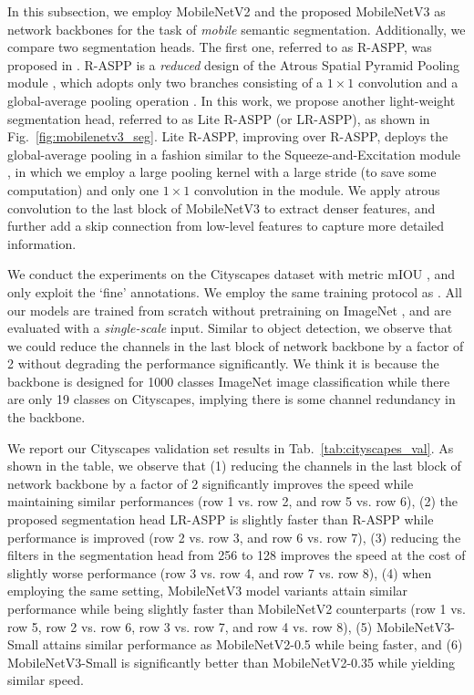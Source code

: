 \documentclass[10pt,twocolumn,letterpaper]{article}
\begin{document}
In this subsection, we employ MobileNetV2 \cite{mobilenetv2} and the proposed MobileNetV3 as network backbones for the task of {\it mobile} semantic segmentation. Additionally, we compare two segmentation heads. The first one, referred to as R-ASPP, was proposed in \cite{mobilenetv2}. R-ASPP is a {\it reduced} design of the Atrous Spatial Pyramid Pooling module \cite{DeepLabV2, DeepLabV3,DeepLabV3Plus}, which adopts only two branches consisting of a $1 \times 1$ convolution and a global-average pooling operation \cite{ParseNet,zhao2017pyramid}. In this work, we propose another light-weight segmentation head, referred to as Lite R-ASPP (or LR-ASPP), as shown in Fig.~\ref{fig:mobilenetv3_seg}. Lite R-ASPP, improving over R-ASPP, deploys the global-average pooling in a fashion similar to the Squeeze-and-Excitation module \cite{squeezeandexcite}, in which we employ a large pooling kernel with a large stride (to save some computation) and only one $1\times1$ convolution in the module. We apply atrous convolution \cite{Holschneider1989real,Sermanet2013Overfeat,Papandreou2014untangling,DeepLabV1} to the last block of MobileNetV3 to extract denser features, and further add a skip connection \cite{long2014fully} from low-level features to capture more detailed information.

We conduct the experiments on the Cityscapes dataset \cite{Cordts2016Cityscapes} with metric mIOU \cite{PASCAL}, and only exploit the `fine' annotations. We employ the same training protocol as \cite{DeepLabV3, mobilenetv2}. All our models are trained from scratch without pretraining on ImageNet \cite{russakovsky:2015:ILS:2846547.2846559}, and are evaluated with a {\it single-scale} input. Similar to object detection, we observe that we could reduce the channels in the last block of network backbone by a factor of 2 without degrading the performance significantly. We think it is because the backbone is designed for 1000 classes ImageNet image classification \cite{russakovsky:2015:ILS:2846547.2846559} while there are only 19 classes on Cityscapes, implying there is some channel redundancy in the backbone.

We report our Cityscapes validation set results in Tab.~\ref{tab:cityscapes_val}. As shown in the table, we observe that (1) reducing the channels in the last block of network backbone by a factor of 2 significantly improves the speed while maintaining similar performances (row 1 vs. row 2, and row 5 vs. row 6), (2) the proposed segmentation head LR-ASPP is slightly faster than R-ASPP \cite{mobilenetv2} while performance is improved (row 2 vs. row 3, and row 6 vs. row 7), (3) reducing the filters in the segmentation head from 256 to 128 improves the speed at the cost of slightly worse performance (row 3 vs. row 4, and row 7 vs. row 8), (4) when employing the same setting, MobileNetV3 model variants attain similar performance while being slightly faster than MobileNetV2 counterparts (row 1 vs. row 5, row 2 vs. row 6, row 3 vs. row 7, and row 4 vs. row 8), (5) MobileNetV3-Small attains similar performance as MobileNetV2-0.5 while being faster, and (6) MobileNetV3-Small is significantly better than MobileNetV2-0.35 while yielding similar speed.
\end{document}

